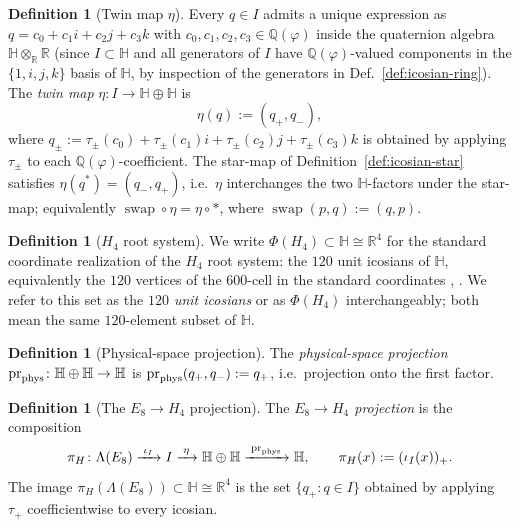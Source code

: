 \documentclass[11pt, a4paper]{amsart}
\theoremstyle{definition}
\newtheorem{definition}[theorem]{Definition}
\newcommand{\R}{\mathbb{R}}
\newcommand{\Q}{\mathbb{Q}}
\newcommand{\HH}{\mathbb{H}}
\begin{document}
\begin{definition}[Twin map $\eta$]
\label{def:eta}
Every $q \in I$ admits a unique expression as $q = c_0 + c_1 i +
c_2 j + c_3 k$ with $c_0, c_1, c_2, c_3 \in \Q(\varphi)$ inside the
quaternion algebra $\HH \otimes_\R \R$ (since $I \subset \HH$ and
all generators of $I$ have $\Q(\varphi)$-valued components in the
$\{1, i, j, k\}$ basis of $\HH$, by inspection of the generators in
Def.~\ref{def:icosian-ring}). The \emph{twin map}
$\eta \colon I \to \HH \oplus \HH$ is
\[
  \eta(q) := (q_+, q_-),
\]
where $q_\pm := \tau_\pm(c_0) + \tau_\pm(c_1) i + \tau_\pm(c_2) j
+ \tau_\pm(c_3) k$ is obtained by applying $\tau_\pm$ to each
$\Q(\varphi)$-coefficient. The star-map of
Definition~\ref{def:icosian-star} satisfies $\eta(q^\ast) =
(q_-, q_+)$, i.e.\ $\eta$ interchanges the two $\HH$-factors under
the star-map; equivalently $\operatorname{swap} \circ \eta = \eta
\circ \ast$, where $\operatorname{swap}(p, q) := (q, p)$.
\end{definition}

\begin{definition}[$H_4$ root system]
\label{def:H4}
We write $\Phi(H_4) \subset \HH \cong \R^4$ for the standard
coordinate realization of the $H_4$ root system: the $120$ unit
icosians of $\HH$, equivalently the $120$ vertices of the $600$-cell
in the standard coordinates \cite[\S 22.7]{CoxeterRegularPolytopes},
\cite[\S 4.1]{MoodyPatera}. We refer to this set as the
\emph{$120$ unit icosians} or as $\Phi(H_4)$ interchangeably; both
mean the same $120$-element subset of $\HH$.
\end{definition}

\begin{definition}[Physical-space projection]
\label{def:pr-phys}
The \emph{physical-space projection}
$\operatorname{pr}_{\rm phys} \colon \HH \oplus \HH \to \HH$ is
$\operatorname{pr}_{\rm phys}(q_+, q_-) := q_+$, i.e.\ projection
onto the first factor.
\end{definition}

\begin{definition}[The $E_8 \to H_4$ projection]
\label{def:pi-H}
The \emph{$E_8 \to H_4$ projection} is the composition
\[
  \pi_H \colon \Lambda(E_8) \xrightarrow{\;\iota_I\;} I
  \xrightarrow{\;\eta\;} \HH \oplus \HH
  \xrightarrow{\;\operatorname{pr}_{\rm phys}\;} \HH,
  \qquad \pi_H(x) := (\iota_I(x))_+.
\]
The image $\pi_H(\Lambda(E_8)) \subset \HH \cong \R^4$ is the set
$\{q_+ : q \in I\}$ obtained by applying $\tau_+$ coefficientwise
to every icosian.
\end{definition}
\end{document}
